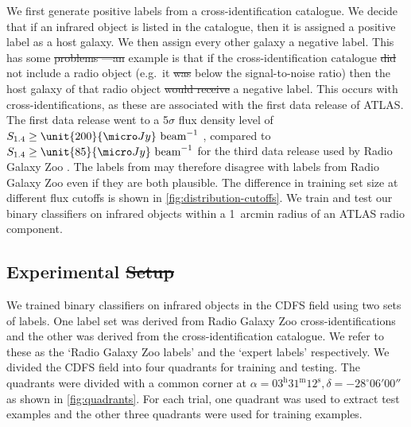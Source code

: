 \documentclass[11pt, a4paper]{book}
\newcommand{\jansky}{Jy}
\providecommand{\DIFaddtex}[1]{{\protect\color{blue}\uwave{#1}}} %
\providecommand{\DIFdeltex}[1]{{\protect\color{red}\sout{#1}}}                      %
\providecommand{\DIFaddbegin}{} %
\providecommand{\DIFaddend}{} %
\providecommand{\DIFdelbegin}{} %
\providecommand{\DIFdelend}{} %
\providecommand{\DIFadd}[1]{\texorpdfstring{\DIFaddtex{#1}}{#1}} %
\providecommand{\DIFdel}[1]{\texorpdfstring{\DIFdeltex{#1}}{}} %
\newcommand{\DIFscaledelfig}{0.5}
\newlength{\DIFdelgraphicswidth} %
\newlength{\DIFdelgraphicsheight} %
\newcommand{\DIFaddincludegraphics}[2][]{{\color{blue}\fbox{\DIFOincludegraphics[#1]{#2}}}} %
\newcommand{\DIFdelincludegraphics}[2][]{%
\sbox{\DIFdelgraphicsbox}{\DIFOincludegraphics[#1]{#2}}%
\settoboxwidth{\DIFdelgraphicswidth}{\DIFdelgraphicsbox} %
\settoboxtotalheight{\DIFdelgraphicsheight}{\DIFdelgraphicsbox} %
\scalebox{\DIFscaledelfig}{%
\parbox[b]{\DIFdelgraphicswidth}{\usebox{\DIFdelgraphicsbox}\\[-\baselineskip] \rule{\DIFdelgraphicswidth}{0em}}\llap{\resizebox{\DIFdelgraphicswidth}{\DIFdelgraphicsheight}{%
\setlength{\unitlength}{\DIFdelgraphicswidth}%
\begin{picture}(1,1)%
\thicklines\linethickness{2pt} %
{\color[rgb]{1,0,0}\put(0,0){\framebox(1,1){}}}%
{\color[rgb]{1,0,0}\put(0,0){\line( 1,1){1}}}%
{\color[rgb]{1,0,0}\put(0,1){\line(1,-1){1}}}%
\end{picture}%
}\hspace*{3pt}}} %
} %
\DeclareRobustCommand{\DIFaddbegin}{\DIFOaddbegin \let\includegraphics\DIFaddincludegraphics} %
\DeclareRobustCommand{\DIFaddend}{\DIFOaddend \let\includegraphics\DIFOincludegraphics} %
\DeclareRobustCommand{\DIFdelbegin}{\DIFOdelbegin \let\includegraphics\DIFdelincludegraphics} %
\DeclareRobustCommand{\DIFdelend}{\DIFOaddend \let\includegraphics\DIFOincludegraphics} %
\begin{document}
    We first generate positive labels from a cross-identification catalogue.
    We decide that if an infrared object is listed in the catalogue, then it
    is assigned a positive label as a host galaxy. We then assign every other galaxy a negative label. This has some \DIFdelbegin \DIFdel{problems
   ---an }\DIFdelend \DIFaddbegin \DIFadd{problems---an }\DIFaddend example is that if the cross-identification catalogue \DIFdelbegin \DIFdel{did }\DIFdelend \DIFaddbegin \DIFadd{does }\DIFaddend not include a radio
    object (e.g.~it \DIFdelbegin \DIFdel{was }\DIFdelend \DIFaddbegin \DIFadd{is }\DIFaddend below the signal-to-noise ratio) then the host galaxy
    of that radio object \DIFdelbegin \DIFdel{would receive }\DIFdelend \DIFaddbegin \DIFadd{receives }\DIFaddend a negative label. This occurs with
    \citet{norris06} cross-identifications, as these are associated with the
    first data release of ATLAS. The first data release went to a 5$\sigma$
    flux density level of $S_{1.4} \geq \unit{200}{\micro\jansky}\text{
    beam}^{-1}$ \citep{norris06}, compared to $S_{1.4} \geq \unit{85}{\micro\jansky}\text{
    beam}^{-1}$ for the third data release used by Radio Galaxy Zoo
    \citep{franzen15}. The labels from \citet{norris06} may therefore disagree with labels
    from Radio Galaxy Zoo even if they are both plausible. The difference in
    training set size at different flux cutoffs is shown in
    \autoref{fig:distribution-cutoffs}. We train and test our binary
    classifiers on infrared objects within a 1~arcmin radius of an ATLAS radio
    component.

  \subsection{Experimental \DIFdelbegin \DIFdel{Setup}\DIFdelend \DIFaddbegin \DIFadd{setup}\DIFaddend }
  \label{sec:atlas-xid-experimental-setup}

    We trained binary classifiers on infrared objects in the CDFS field using
    two sets of labels. One label set was derived from Radio Galaxy Zoo
    cross-identifications and the other was derived from the \citet{norris06}
    cross-identification catalogue. We refer to these as the `Radio Galaxy Zoo
    labels' and the `expert labels' respectively. We divided the CDFS field
    into four quadrants for training and testing. The quadrants were divided
    with a common corner at $\alpha = 03^\text{h}31^\text{m}12^\text{s},
    \delta = -28^\circ{}06'00''$ as shown in \autoref{fig:quadrants}. For
    each trial, one quadrant was used to extract test examples and the other
    three quadrants were used for training examples.
\end{document}
